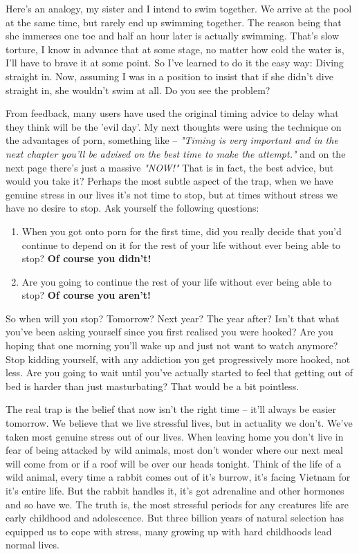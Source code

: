 \documentclass[easypeasy.tex]{subfiles}
\begin{document}
Here's an analogy, my sister and I intend to swim together. We arrive at the pool at the same time, but rarely end up swimming together. The reason being that she immerses one toe and half an hour later is actually swimming. That's slow torture, I know in advance that at some stage, no matter how cold the water is, I'll have to brave it at some point. So I've learned to do it the easy way: Diving straight in. Now, assuming I was in a position to insist that if she didn't dive straight in, she wouldn't swim at all. Do you see the problem?

From feedback, many users have used the original timing advice to delay what they think will be the 'evil day'. My next thoughts were using the technique on the advantages of porn, something like -- \textit{"Timing is very important and in the next chapter you'll be advised on the best time to make the attempt."} and on the next page there's just a massive \textit{"NOW!"} That is in fact, the best advice, but would you take it? Perhaps the most subtle aspect of the trap, when we have genuine stress in our lives it's not time to stop, but at times without stress we have no desire to stop. Ask yourself the following questions: 

\begin{enumerate}
  \item When you got onto porn for the first time, did you really decide that you'd continue to depend on it for the rest of your life without ever being able to stop? \textbf{Of course you didn't!}

  \item Are you going to continue the rest of your life without ever being able to stop? \textbf{Of course you aren't!}
  \end{enumerate}

So when will you stop? Tomorrow? Next year? The year after? Isn't that what you've been asking yourself since you first realised you were hooked? Are you hoping that one morning you'll wake up and just not want to watch anymore? Stop kidding yourself, with any addiction you get progressively more hooked, not less. Are you going to wait until you've actually started to feel that getting out of bed is harder than just masturbating? That would be a bit pointless.

The real trap is the belief that now isn't the right time -- it'll always be easier tomorrow. We believe that we live stressful lives, but in actuality we don't. We've taken most genuine stress out of our lives. When leaving home you don't live in fear of being attacked by wild animals, most don't wonder where our next meal will come from or if a roof will be over our heads tonight. Think of the life of a wild animal, every time a rabbit comes out of it's burrow, it's facing Vietnam for it's entire life. But the rabbit handles it, it's got adrenaline and other hormones and so have we. The truth is, the most stressful periods for any creatures life are early childhood and adolescence. But three billion years of natural selection has equipped us to cope with stress, many growing up with hard childhoods lead normal lives.
\end{document}
